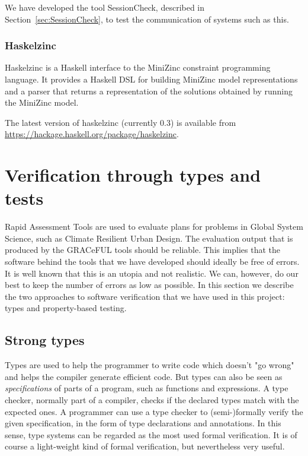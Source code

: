 \documentclass{article}
\begin{document}
We have developed the tool SessionCheck, described in
Section~\ref{sec:SessionCheck}, to test the communication of systems such as this.

\subsubsection*{Haskelzinc}

Haskelzinc is a Haskell interface to the MiniZinc constraint
programming language.
%
It provides a Haskell DSL for building MiniZinc model representations and a parser that returns a representation of the solutions obtained
by running the MiniZinc model.

The latest version of haskelzinc (currently 0.3) is available from
\url{https://hackage.haskell.org/package/haskelzinc}.


\section{Verification through types and tests}
\label{sec:verification}

Rapid Assessment Tools are used to evaluate plans for problems in
Global System Science, such as Climate Resilient Urban Design.
%
The evaluation output that is produced by the GRACeFUL tools should be
reliable.
%
This implies that the software behind the tools that we have developed
should ideally be free of errors.
%
It is well known that this is an utopia and not realistic.
%
We can, however, do our best to keep the number of errors as low as
possible.
%
In this section we describe the two approaches to software
verification that we have used in this project: types and
property-based testing.

\subsection{Strong types}

Types are used to help the programmer to write code which doesn't "go
wrong" and helps the compiler generate efficient code.
%
But types can also be seen as \emph{specifications} of parts of a
program, such as functions and expressions.
%
A type checker, normally part of a compiler, checks if the declared
types match with the expected ones.
%
A programmer can use a type checker to (semi-)formally verify the
given specification, in the form of type declarations and
annotations.
%
In this sense, type systems can be regarded as the most used formal
verification.
%
It is of course a light-weight kind of formal verification, but
nevertheless very useful.
\end{document}
